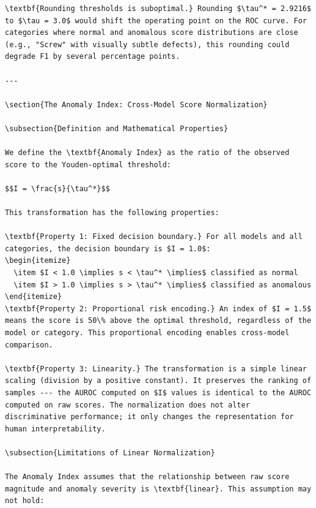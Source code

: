\documentclass[12pt,a4paper,oneside]{report}
\begin{document}
\begin{verbatim}
\textbf{Rounding thresholds is suboptimal.} Rounding $\tau^* = 2.9216$ to $\tau = 3.0$ would shift the operating point on the ROC curve. For categories where normal and anomalous score distributions are close (e.g., "Screw" with visually subtle defects), this rounding could degrade F1 by several percentage points.

---

\section{The Anomaly Index: Cross-Model Score Normalization}

\subsection{Definition and Mathematical Properties}

We define the \textbf{Anomaly Index} as the ratio of the observed score to the Youden-optimal threshold:

$$I = \frac{s}{\tau^*}$$

This transformation has the following properties:

\textbf{Property 1: Fixed decision boundary.} For all models and all categories, the decision boundary is $I = 1.0$:
\begin{itemize}
  \item $I < 1.0 \implies s < \tau^* \implies$ classified as normal
  \item $I > 1.0 \implies s > \tau^* \implies$ classified as anomalous
\end{itemize}
\textbf{Property 2: Proportional risk encoding.} An index of $I = 1.5$ means the score is 50\% above the optimal threshold, regardless of the model or category. This proportional encoding enables cross-model comparison.

\textbf{Property 3: Linearity.} The transformation is a simple linear scaling (division by a positive constant). It preserves the ranking of samples --- the AUROC computed on $I$ values is identical to the AUROC computed on raw scores. The normalization does not alter discriminative performance; it only changes the representation for human interpretability.

\subsection{Limitations of Linear Normalization}

The Anomaly Index assumes that the relationship between raw score magnitude and anomaly severity is \textbf{linear}. This assumption may not hold:


\end{verbatim}
\end{document}
